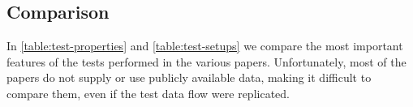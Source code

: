 \subsection{}

\subsection{Comparison}
In \autoref{table:test-properties} and \autoref{table:test-setups} we compare the most important features of the tests performed in the various papers. Unfortunately, most of the papers do not supply or use publicly available data, making it difficult to compare them, even if the test data flow were replicated.

